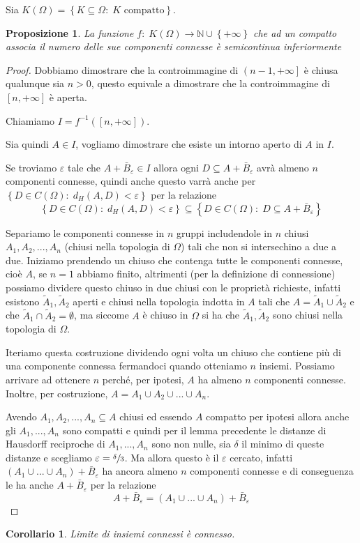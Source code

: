 \documentclass[a4paper,10pt]{article}
\newcounter{counter1}
\theoremstyle{plain}
\newtheorem{mypro}[counter1]{Proposizione}
\newtheorem{mycor}[counter1]{Corollario}
\theoremstyle{definition}
\theoremstyle{remark}
\newcommand{\set}[1]{\left\{#1\right\}}
\newcommand{\pa}[1]{\left(#1\right)}
\newcommand{\bra}[1]{\left[#1\right]}
\begin{document}
Sia $K(\Omega) = \set{K\subseteq \Omega :\; K \text{ compatto}}$.

\begin{mypro}
  La funzione $f:\; K(\Omega) \rightarrow \mathbb{N} \cup \set{+\infty}$
  che ad un compatto associa il numero delle sue componenti connesse è
  semicontinua inferiormente
\end{mypro}
\begin{proof}
  Dobbiamo dimostrare che la controimmagine di $\left(n-1,
    +\infty\right]$ è chiusa qualunque sia $n>0$, questo equivale a
  dimostrare che la controimmagine di $\bra{n,+\infty}$ è aperta.

  Chiamiamo $I = f^{-1}\pa{\bra{n,+\infty}}$.

  Sia quindi $A \in I$, vogliamo dimostrare che esiste un intorno
  aperto di $A$ in $I$.

  Se troviamo $\varepsilon$ tale che $A + \bar B_{\varepsilon} \in I$
  allora ogni $D \subseteq A + \bar B_{\varepsilon}$ avrà almeno $n$
  componenti connesse, quindi anche questo varrà anche per $\set{D \in
    C(\Omega):\; d_H(A,D) < \varepsilon}$ per la relazione
  \[ \set{D \in C(\Omega):\; d_H(A,D) < \varepsilon} \subseteq \set{D
    \in C(\Omega):\; D \subseteq A + \bar B_{\varepsilon}} \]

  Separiamo le componenti connesse in $n$ gruppi includendole in $n$
  chiusi $A_1,A_2,...,A_n$ (chiusi nella topologia di $\Omega$) tali
  che non si intersechino a due a due. Iniziamo prendendo un chiuso
  che contenga tutte le componenti connesse, cioè $A$, se $n=1$
  abbiamo finito, altrimenti (per la definizione di connessione)
  possiamo dividere questo chiuso in due chiusi con le proprietà
  richieste, infatti esistono $\tilde A_1, \tilde A_2$ aperti e chiusi
  nella topologia indotta in $A$ tali che $A = \tilde A_1 \cup \tilde
  A_2$ e che $\tilde A_1 \cap \tilde A_2 = \emptyset$, ma siccome $A$
  è chiuso in $\Omega$ si ha che $\tilde A_1, \tilde A_2$ sono chiusi
  nella topologia di $\Omega$.

  Iteriamo questa costruzione dividendo ogni volta un chiuso che
  contiene più di una componente connessa fermandoci quando otteniamo
  $n$ insiemi. Possiamo arrivare ad ottenere $n$ perché, per ipotesi,
  $A$ ha almeno $n$ componenti connesse. Inoltre, per costruzione, $A
  = A_1 \cup A_2 \cup ... \cup A_n$.

  Avendo $A_1,A_2,..., A_n \subseteq A$ chiusi ed essendo $A$ compatto
  per ipotesi allora anche gli $A_1, ..., A_n$ sono compatti e quindi
  per il lemma precedente le distanze di Hausdorff reciproche di $A_1,
  ..., A_n$ sono non nulle, sia $\delta$ il minimo di queste distanze
  e scegliamo $\varepsilon = \sfrac{\delta}{3}$. Ma allora questo è il
  $\varepsilon$ cercato, infatti $\pa{A_1\cup ... \cup A_n} + \bar B
  _\varepsilon$ ha ancora almeno $n$ componenti connesse e di
  conseguenza le ha anche $A + \bar B_{\varepsilon}$ per la relazione
  \[ A + \bar B_{\varepsilon} = \pa{A_1\cup ... \cup A_n} + \bar
  B_\varepsilon\]
\end{proof}
\begin{mycor}
  Limite di insiemi connessi è connesso.
\end{mycor}
\end{document}
